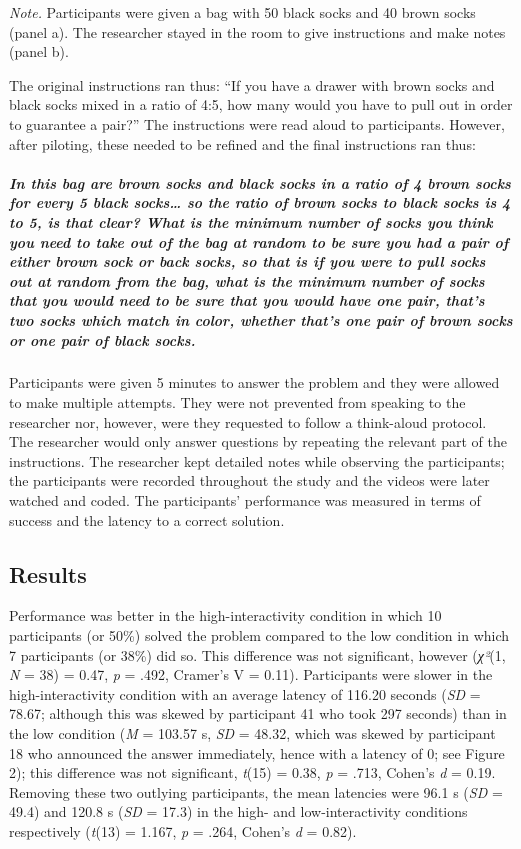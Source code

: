 \documentclass{article}
\begin{document}
\emph{Note.} Participants were given a bag with 50 black socks and 40 brown socks (panel a). The researcher stayed in the room to give instructions and make notes (panel b).

The original instructions ran thus: “If you have a drawer with brown socks and black socks mixed in a ratio of 4:5, how many would you have to pull out in order to guarantee a pair?” The instructions were read aloud to participants. However, after piloting, these needed to be refined and the final instructions ran thus: 

\subparagraph{In this bag are brown socks and black socks in a ratio of 4 brown socks for every 5 black socks… so the ratio of brown socks to black socks is 4 to 5, \emph{is that clear}? What is the minimum number of socks you think you need to take out of the bag at random to be sure you had a pair of either brown sock or back socks, so that is if you were to pull socks out at random from the bag, what is the minimum number of socks that you would need to be sure that you would have one pair, \emph{that's two socks which match in color,} whether that's one pair of brown socks or one pair of black socks.}

Participants were given 5 minutes to answer the problem and they were allowed to make multiple attempts. They were not prevented from speaking to the researcher nor, however, were they requested to follow a think-aloud protocol. The researcher would only answer questions by repeating the relevant part of the instructions. The researcher kept detailed notes while observing the participants; the participants were recorded throughout the study and the videos were later watched and coded. The participants' performance was measured in terms of success and the latency to a correct solution. 

\subsection{Results}

Performance was better in the high-interactivity condition in which 10 participants (or 50\%) solved the problem compared to the low condition in which 7 participants (or 38\%) did so. This difference was not significant, however (\emph{χ²}(1, \emph{N} = 38) = 0.47, \emph{p }= .492, Cramer's V = 0.11). Participants were slower in the high-interactivity condition with an average latency of 116.20 seconds (\emph{SD }= 78.67; although this was skewed by participant 41 who took 297 seconds) than in the low condition (\emph{M} = 103.57 s, \emph{SD} = 48.32, which was skewed by participant 18 who announced the answer immediately, hence with a latency of 0; see Figure 2); this difference was not significant, \emph{t}(15) = 0.38, \emph{p} = .713, Cohen's \emph{d} = 0.19. Removing these two outlying participants, the mean latencies were 96.1 s (\emph{SD} = 49.4) and 120.8 s (\emph{SD} = 17.3) in the high- and low-interactivity conditions respectively (\emph{t}(13) = 1.167, \emph{p} = .264, Cohen's \emph{d} = 0.82).
\end{document}
